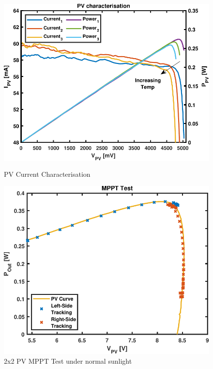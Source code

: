 \documentclass[10pt,twoside]{article}
\begin{document}
\begin{figure}[hbt!]
  \begin{minipage}[b]{0.47\textwidth}
    \centering
    \includegraphics[width=\textwidth]{PVCombined.pdf}
    \caption{PV Current Characterisation}
    \label{fig:PVvoltage}
  \end{minipage}
  \hspace{0.8cm}
  \begin{minipage}[b]{0.44\textwidth}
    \includegraphics[width=\textwidth]{MPPT.pdf}
    \caption{2x2 PV MPPT Test under normal sunlight }
    \label{fig:TestMPPT}
  \end{minipage}
\end{figure}
\end{document}
